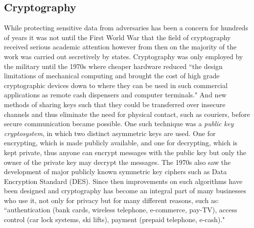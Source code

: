 \documentclass[12pt, titlepage]{article}
\begin{document}
\subsection{Cryptography}
While protecting sensitive data from adversaries has been a concern for hundreds of years it was not until the First World War that the field of cryptography received serious academic attention however from then on the majority of the work was carried out secretively by states.\cite{appliedCryptoBook} Cryptography was only employed by the military until the 1970s where cheaper hardware reduced ``the design limitations of mechanical computing and brought the cost of high grade cryptographic devices down to where they can be used in such commercial applications as remote cash dispensers and computer terminals."\cite{newCryptoDirections} And new methods of sharing keys such that they could be transferred over insecure channels and thus eliminate the need for physical contact, such as couriers, before secure communication became possible. One such technique was a \textit{public key cryptosystem}, in which two distinct asymmetric keys are used. One for encrypting, which is made publicly available, and one for decrypting, which is kept private, thus anyone can encrypt messages with the public key but only the owner of the private key may decrypt the messages. The 1970s also saw the development of major publicly known symmetric key ciphers such as Data Encryption Standard (DES). Since then improvements on such algorithms have been designed and cryptography has become an integral part of many businesses who use it, not only for privacy but for many different reasons, such as: ``authentication (bank cards, wireless telephone, e-commerce, pay-TV), access control (car lock systems, ski lifts), payment (prepaid telephone, e-cash)."\cite{classicalCryptoBook}
\end{document}
